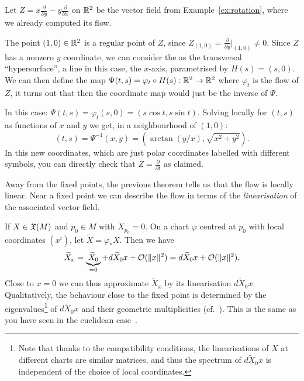 \begin{example}\label{ex:hyplin}
Let $Z = x\frac{\partial}{\partial y} - y\frac{\partial}{\partial x}$ on $\mathbb{R}^2$ be the vector field from Example~\ref{ex:rotation}, where we already computed its flow.

The point $(1,0)\in\mathbb{R}^2$ is a regular point of $Z$, since $Z_{(1,0)} = \frac{\partial}{\partial y}\Big|_{(1,0)} \neq 0$.
Since $Z$ has a nonzero $y$ coordinate, we can consider the as the transversal ``hypersurface'', a line in this case, the $x$-axis, parametrised by $H(s) = (s,0)$.
We can then define the map $\Psi(t,s) = \varphi_t\circ H(s) : \mathbb{R}^2\to\mathbb{R}^2$ where $\varphi_t$ is the flow of $Z$, it turns out that then the coordinate map would just be the inverse of $\Psi$.

In this case: $\Psi(t,s) = \varphi_t(s,0) = (s\cos t, s\sin t)$.
Solving locally for $(t,s)$ as functions of $x$ and $y$ we get, in a neighbourhood of $(1,0)$:
\begin{equation}
  (t,s) = \Psi^{-1}(x,y) = \left(\arctan(y/x), \sqrt{x^2+y^2}\right).
\end{equation}
In this new coordinates, which are just polar coordinates labelled with different symbols, you can directly check that $Z = \frac{\partial}{\partial t}$ as claimed.
\end{example}

\begin{remark}
  Away from the fixed points, the previous theorem tells us that the flow is locally linear.
  Near a fixed point we can describe the flow in terms of the \emph{linearisation} of the associated vector field.

  If $X\in\mathfrak{X}(M)$ and $p_0\in M$ with $X_{p_0} = 0$. On a chart $\varphi$ centred at $p_0$ with local coordinates $(x^i)$, let $\widetilde X = \varphi_* X$.
  Then we have
  \begin{equation}
    \widetilde X_x = \underbrace{\widetilde X_0}_{=0} + d\widetilde X_0 x + \mathcal{O}(\|x\|^2) = d\widetilde X_0 x + \mathcal{O}(\|x\|^2).
  \end{equation}
  Close to $x=0$ we can thus approximate $\widetilde X_x$ by its linearisation $ d\widetilde X_0 x$.
  Qualitatively, the behaviour close to the fixed point is determined by the eigenvalues\footnote{Note that thanks to the compatibility conditions, the linearisations of $X$ at different charts are similar matrices, and thus the spectrum of $d\widetilde X_0 x$ is independent of the choice of local coordinates.} of $d\widetilde X_0 x$ and their geometric multiplicities (cf.~\cite[Figure 9.8]{book:lee}). This is the same as you have seen in the euclidean case~\cite[Chapter 5.3]{book:knauf}.
\end{remark}

